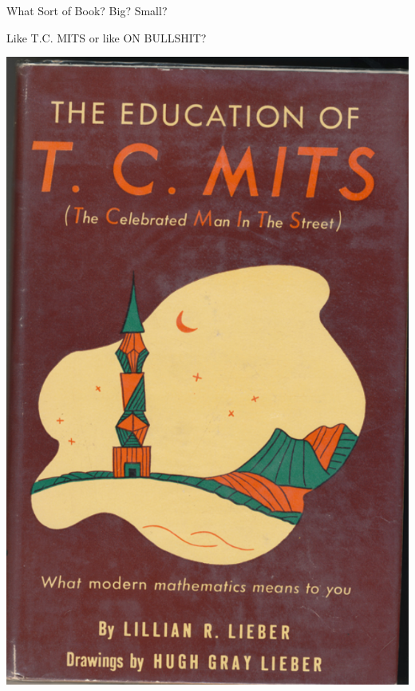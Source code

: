 \documentclass{beamer}
\begin{document}
\begin{frame}{What Sort of Book?  Big? Small?}
  \begin{center}
    Like T.\thinspace{}C. MITS or like ON BULLSHIT?
    \vspace{1ex}

    \includegraphics[height=.75\textheight]{pics/tc-mits.png}
    \hspace{2em}

\end{center}
\end{frame}
\end{document}
